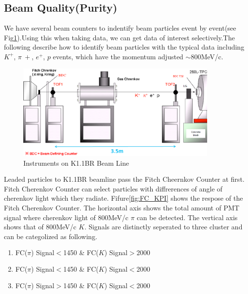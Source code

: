 \subsection{Beam Quality(Purity)}

We have several beam counters to indentify beam particles event by event(see Fig\ref{fig:Beamline}).Using this when taking data, we can get data of interest selectively.The following describe how to identify beam particles with the typical data including $K^{+}$, $\pi~{+}$, $e^{+}$, $p$ events, which have the momentum adjusted $\sim$800MeV/c.\\

\begin{figure}[htbp]
  \centering
  \includegraphics[width=10cm,clip]{fig/Beamline.eps}
  \caption{Instruments on K1.1BR Beam Line}
  \label{fig:Beamline}
\end{figure}

Leaded particles to K1.1BR beamline pass the Fitch Cheernkov Counter at first.
Fitch Cherenkov Counter can select particles with diffrerences of angle of cherenkov light which they radiate.
Fifure\ref{fig:FC_KPI} shows the respose of the Fitch Cherenkov Counter.
The horizontal axis shows the total amount of PMT signal where cherenkov light of 800MeV/c $\pi$ can be detected.
The vertical axis shows that of 800MeV/c $K$.
Signals are distinctly seperated to three cluster and can be categolized as following.\\

\begin{enumerate}
\item FC($\pi$) Signal$<$1450 \& FC($K$) Signal$>$2000 \\
\item FC($\pi$) Signal$<$1450 \& FC($K$) Signal$<$2000 \\
\item FC($\pi$) Signal$>$1450 \& FC($K$) Signal$<$2000 \\
\end{enumerate}


